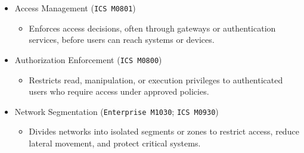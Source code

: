 \documentclass[10pt,a4paper,oneside]{report}
\begin{document}
\begin{itemize}
\begin{itemize}
\begin{itemize}
\item Runs code in a controlled, isolated environment to limit access to sensitive resources and reduce impact.
\end{itemize}
\item Access Management (\texttt{ICS M0801})
\begin{itemize}
\item Enforces access decisions, often through gateways or authentication services, before users can reach systems or devices.
\end{itemize}
\item Authorization Enforcement (\texttt{ICS M0800})
\begin{itemize}
\item Restricts read, manipulation, or execution privileges to authenticated users who require access under approved policies.
\end{itemize}
\item Network Segmentation (\texttt{Enterprise M1030}; \texttt{ICS M0930})
\begin{itemize}
\item Divides networks into isolated segments or zones to restrict access, reduce lateral movement, and protect critical systems.
\end{itemize}
\end{itemize}
\end{itemize}
\end{document}
